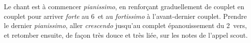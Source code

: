 


\bigskip
{\footnotesize Le chant est à commencer \emph{pianissimo}, en
renforçant graduellement de couplet en couplet pour arriver \emph{forte}
au 6\ieme\ et au \emph{fortissimo} à l'avant-dernier couplet. Prendre le
dernier \emph{pianissimo}, aller \emph{crescendo} jusqu'au complet
épanouissement du 2\ieme\ vers, et retomber ensuite, de façon très douce
et très liée, sur les notes de l'appel scout.}
